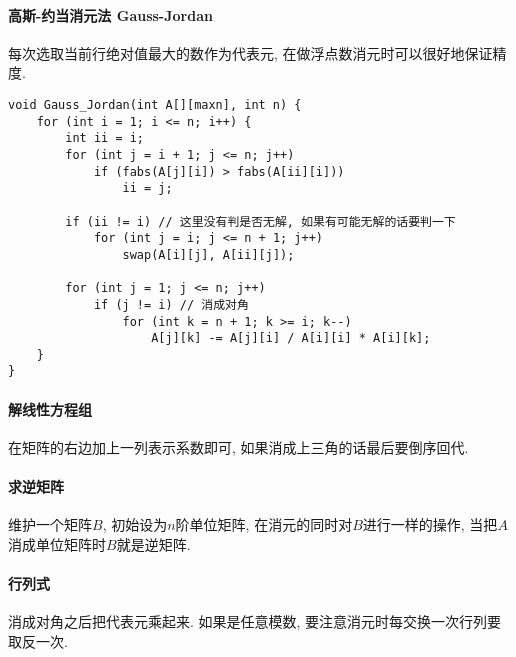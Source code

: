 \paragraph{高斯-约当消元法 Gauss-Jordan}

每次选取当前行绝对值最大的数作为代表元, 在做浮点数消元时可以很好地保证精度.

\begin{verbatim}
void Gauss_Jordan(int A[][maxn], int n) {
    for (int i = 1; i <= n; i++) {
        int ii = i;
        for (int j = i + 1; j <= n; j++)
            if (fabs(A[j][i]) > fabs(A[ii][i]))
                ii = j;

        if (ii != i) // 这里没有判是否无解, 如果有可能无解的话要判一下
            for (int j = i; j <= n + 1; j++)
                swap(A[i][j], A[ii][j]);
        
        for (int j = 1; j <= n; j++)
            if (j != i) // 消成对角
                for (int k = n + 1; k >= i; k--)
                    A[j][k] -= A[j][i] / A[i][i] * A[i][k];
    }
}
\end{verbatim}

\paragraph{解线性方程组}

在矩阵的右边加上一列表示系数即可, 如果消成上三角的话最后要倒序回代.

\paragraph{求逆矩阵}

维护一个矩阵$B$, 初始设为$n$阶单位矩阵, 在消元的同时对$B$进行一样的操作, 当把$A$消成单位矩阵时$B$就是逆矩阵.

\paragraph{行列式}

消成对角之后把代表元乘起来. 如果是任意模数, 要注意消元时每交换一次行列要取反一次.